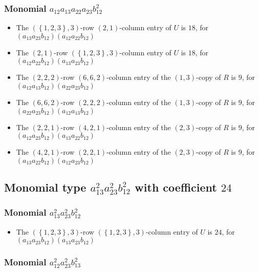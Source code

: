 \documentclass{article}
\begin{document}
\subsubsection{Monomial $ a_{12} a_{13} a_{22} a_{23} b_{12}^{2} $}

\begin{itemize}
\item The $ \left(\left\{1, 2, 3\right\}, 3\right) $-row $ \left(2, 1\right) $-column entry of $U$ is $ 18 $, for $( a_{13} a_{23} b_{12} )( a_{12} a_{22} b_{12} )$ 
\item The $ \left(2, 1\right) $-row $ \left(\left\{1, 2, 3\right\}, 3\right) $-column entry of $U$ is $ 18 $, for $( a_{12} a_{22} b_{12} )( a_{13} a_{23} b_{12} )$ 
\item The $(2, 2, 2)$-row $(6, 6, 2)$-column entry of the $ \left(1, 3\right) $-copy of $R$ is $ 9 $, for $( a_{12} a_{13} b_{12} )( a_{22} a_{23} b_{12} )$ 
\item The $(6, 6, 2)$-row $(2, 2, 2)$-column entry of the $ \left(1, 3\right) $-copy of $R$ is $ 9 $, for $( a_{22} a_{23} b_{12} )( a_{12} a_{13} b_{12} )$ 
\item The $(2, 2, 1)$-row $(4, 2, 1)$-column entry of the $ \left(2, 3\right) $-copy of $R$ is $ 9 $, for $( a_{12} a_{23} b_{12} )( a_{13} a_{22} b_{12} )$ 
\item The $(4, 2, 1)$-row $(2, 2, 1)$-column entry of the $ \left(2, 3\right) $-copy of $R$ is $ 9 $, for $( a_{13} a_{22} b_{12} )( a_{12} a_{23} b_{12} )$ 
\end{itemize}
\subsection{Monomial type $ a_{13}^{2} a_{23}^{2} b_{12}^{2} $ with coefficient $ 24 $}

\subsubsection{Monomial $ a_{13}^{2} a_{23}^{2} b_{12}^{2} $}

\begin{itemize}
\item The $ \left(\left\{1, 2, 3\right\}, 3\right) $-row $ \left(\left\{1, 2, 3\right\}, 3\right) $-column entry of $U$ is $ 24 $, for $( a_{13} a_{23} b_{12} )( a_{13} a_{23} b_{12} )$ 
\end{itemize}
\subsubsection{Monomial $ a_{12}^{2} a_{23}^{2} b_{13}^{2} $}
\end{document}
